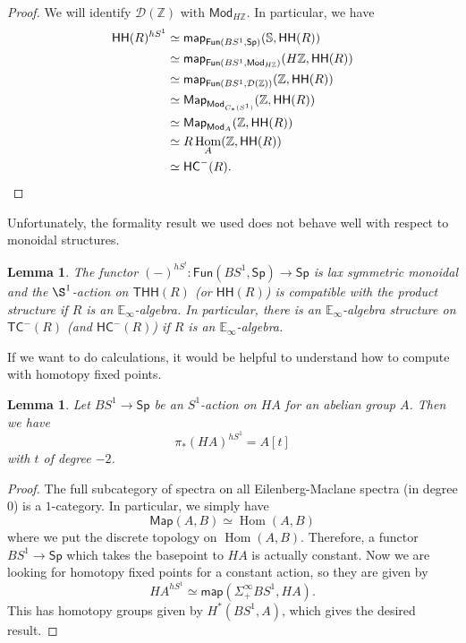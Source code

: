 \documentclass[10pt, oneside]{memoir}
\newtheorem{lem}[thm]{Lemma}
\theoremstyle{definition}
\theoremstyle{remark}
\theoremstyle{plain}
\theoremstyle{definition}
\theoremstyle{remark}
\newcommand{\Z}{\mathbb{Z}}
\newcommand{\E}{\mathbb{E}}
\newcommand{\bS}{\mathbb{S}}
\newcommand{\mc}[1]{\mathcal{#1}}
\newcommand{\ms}[1]{\mathsf{#1}}
\newcommand{\1}{\mathbf{1}}
\newcommand{\2}{\mathbf{2}}
\newcommand{\3}{\mathbf{3}}
\newcommand{\HC}{\ms{HC}}
\newcommand{\THH}{\ms{THH}}
\newcommand{\TC}{\ms{TC}}
\newcommand{\HH}{\ms{HH}}
\DeclareMathOperator{\Hom}{Hom}
\begin{document}
\begin{proof}
    We will identify $\mc{D}(\Z)$ with $\ms{Mod}_{H\Z}$. In particular, we have
    \begin{align*}
        \HH(R)^{hS^1} &\simeq \ms{map}_{\ms{Fun}(BS^1, \ms{Sp})}(\bS, \HH(R)) \\
        &\simeq \ms{map}_{\ms{Fun}(BS^1, \ms{Mod}_{H\Z})}(H\Z, \HH(R)) \\
        &\simeq \ms{map}_{\ms{Fun}(BS^1, \mc{D}(\Z))} (\Z, \HH(R)) \\
        &\simeq \ms{Map}_{\ms{Mod}_{C_*(S^1)}} (\Z, \HH(R)) \\
        &\simeq \ms{Map}_{\ms{Mod}_A} (\Z, \HH(R)) \\
        &\simeq R\Hom_A(\Z, \HH(R)) \\
        &\simeq \HC^-(R). \qedhere
    \end{align*}
\end{proof}

Unfortunately, the formality result we used does not behave well with respect to monoidal structures.

\begin{lem}
    The functor $(-)^{hS^!} \colon \ms{Fun}(BS^1, \ms{Sp}) \to \ms{Sp}$ is lax symmetric monoidal and the $\S^1$-action on $\THH(R)$ (or $\HH(R)$) is compatible with the product structure if $R$ is an $\E_{\infty}$-algebra. In particular, there is an $\E_{\infty}$-algebra structure on $\TC^-(R)$ (and $\HC^-(R)$) if $R$ is an $\E_{\infty}$-algebra.
\end{lem}

If we want to do calculations, it would be helpful to understand how to compute with homotopy fixed points.

\begin{lem}
    Let $BS^1 \to \ms{Sp}$ be an $S^1$-action on $HA$ for an abelian group $A$. Then we have
    \[ \pi_*(HA)^{hS^1} = A[t] \]
    with $t$ of degree $-2$.
\end{lem}

\begin{proof}
    The full subcategory of spectra on all Eilenberg-Maclane spectra (in degree $0$) is a $1$-category. In particular, we simply have
    \[ \ms{Map}(A, B) \simeq \Hom(A,B) \]
    where we put the discrete topology on $\Hom(A,B)$. Therefore, a functor $BS^1 \to \ms{Sp}$ which takes the basepoint to $HA$ is actually constant. Now we are looking for homotopy fixed points for a constant action, so they are given by
    \[ HA^{hS^1} \simeq \ms{map}(\Sigma_+^{\infty} BS^1, HA). \]
    This has homotopy groups given by $H^*(BS^1, A)$, which gives the desired result.
\end{proof}
\end{document}
